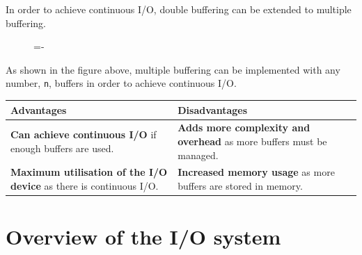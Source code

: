 \documentclass[a4paper]{systems-software}
\begin{document}
In order to achieve continuous I/O, double buffering can be extended to multiple buffering.

\begin{figure}[H]
  \lineskip=-\fboxrule
\end{figure}

As shown in the figure above, multiple buffering can be implemented with any number, \texttt{n}, buffers in order to achieve continuous I/O.

\begin{longtabu} to \textwidth {| X[1,l] | X[1,l] |}
    \hline
    \textbf{Advantages} & \textbf{Disadvantages}
	\\ \hline
	\textbf{Can achieve continuous I/O} if enough buffers are used. &
	\textbf{Adds more complexity and overhead} as more buffers must be managed.
	\\ \hline
	\textbf{Maximum utilisation of the I/O device} as there is continuous I/O. &
	\textbf{Increased memory usage} as more buffers are stored in memory.
	\\ \hline
\end{longtabu}


\newpage

\section*{Overview of the I/O system}
\end{document}
